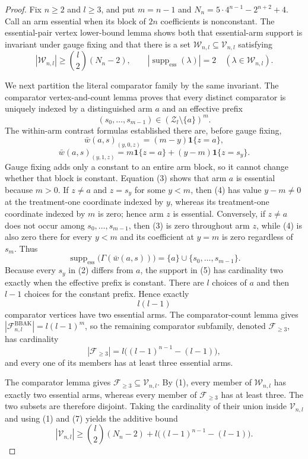 \documentclass{article}
\begin{document}
\begin{proof}
Fix \(n\ge2\) and \(l\ge3\), and put \(m=n-1\) and \(N_n=5\cdot4^{n-1}-2^{n+2}+4\). Call an arm essential when its block of \(2n\) coefficients is nonconstant. The essential-pair vertex lower-bound lemma shows both that essential-arm support is invariant under gauge fixing and that there is a set \(\mathcal W_{n,l}\subseteq\mathcal V_{n,l}\) satisfying
\[|\mathcal W_{n,l}|\ge\binom l2(N_n-2),\qquad |\operatorname{supp}_{\mathrm{ess}}(\lambda)|=2\quad(\lambda\in\mathcal W_{n,l}).\tag{1}\]

We next partition the literal comparator family by the same invariant. The comparator vertex-and-count lemma proves that every distinct comparator is uniquely indexed by a distinguished arm \(a\) and an effective prefix
\[(s_0,\ldots,s_{m-1})\in(\mathcal Z_l\setminus\{a\})^m.\tag{2}\]
The within-arm contrast formulas established there are, before gauge fixing,
\[\bar w(a,s)_{(y,0,z)}=(m-y)\mathbf1\{z=a\},\tag{3}\]
\[\bar w(a,s)_{(y,1,z)}=m\mathbf1\{z=a\}+(y-m)\mathbf1\{z=s_y\}.\tag{4}\]
Gauge fixing adds only a constant to an entire arm block, so it cannot change whether that block is constant. Equation (3) shows that arm \(a\) is essential because \(m>0\). If \(z\ne a\) and \(z=s_y\) for some \(y<m\), then (4) has value \(y-m\ne0\) at the treatment-one coordinate indexed by \(y\), whereas its treatment-one coordinate indexed by \(m\) is zero; hence arm \(z\) is essential. Conversely, if \(z\ne a\) does not occur among \(s_0,\ldots,s_{m-1}\), then (3) is zero throughout arm \(z\), while (4) is also zero there for every \(y<m\) and its coefficient at \(y=m\) is zero regardless of \(s_m\). Thus
\[\operatorname{supp}_{\mathrm{ess}}\bigl(\Gamma(\bar w(a,s))\bigr)=\{a\}\cup\{s_0,\ldots,s_{m-1}\}.\tag{5}\]
Because every \(s_y\) in (2) differs from \(a\), the support in (5) has cardinality two exactly when the effective prefix is constant. There are \(l\) choices of \(a\) and then \(l-1\) choices for the constant prefix. Hence exactly
\[l(l-1)\tag{6}\]
comparator vertices have two essential arms. The comparator-count lemma gives \(|\mathcal F^{\mathrm{BBAK}}_{n,l}|=l(l-1)^m\), so the remaining comparator subfamily, denoted \(\mathcal F_{\ge3}\), has cardinality
\[|\mathcal F_{\ge3}|=l\bigl((l-1)^{n-1}-(l-1)\bigr),\tag{7}\]
and every one of its members has at least three essential arms.

The comparator lemma gives \(\mathcal F_{\ge3}\subseteq\mathcal V_{n,l}\). By (1), every member of \(\mathcal W_{n,l}\) has exactly two essential arms, whereas every member of \(\mathcal F_{\ge3}\) has at least three. The two subsets are therefore disjoint. Taking the cardinality of their union inside \(\mathcal V_{n,l}\) and using (1) and (7) yields the additive bound
\[|\mathcal V_{n,l}|\ge\binom l2(N_n-2)+l\bigl((l-1)^{n-1}-(l-1)\bigr).\tag{8}\]


\end{proof}
\end{document}
